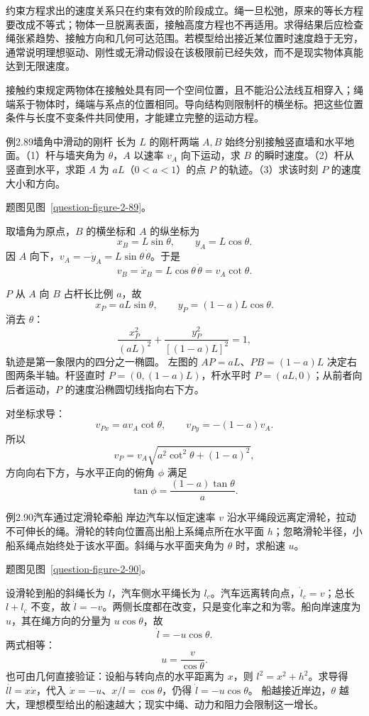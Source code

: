 约束方程求出的速度关系只在约束有效的阶段成立。绳一旦松弛，原来的等长方程要改成不等式；物体一旦脱离表面，接触高度方程也不再适用。求得结果后应检查绳张紧趋势、接触方向和几何可达范围。若模型给出接近某位置时速度趋于无穷，通常说明理想驱动、刚性或无滑动假设在该极限前已经失效，而不是现实物体真能达到无限速度。

接触约束规定两物体在接触处具有同一个空间位置，且不能沿公法线互相穿入；绳端系于物体时，绳端与系点的位置相同。导向结构则限制杆的横坐标。把这些位置条件与长度不变条件共同使用，才能建立完整的运动方程。

\begin{origexamplebox}{例2.89\quad 墙角中滑动的刚杆}
长为 $L$ 的刚杆两端 $A,B$ 始终分别接触竖直墙和水平地面。（1）杆与墙夹角为 $\theta$，$A$ 以速率 $v_A$ 向下运动，求 $B$ 的瞬时速度。（2）杆从竖直到水平，求距 $A$ 为 $aL$（$0<a<1$）的点 $P$ 的轨迹。（3）求该时刻 $P$ 的速度大小和方向。
\par 题图见图~\ref{question-figure-2-89}。
\KQuestionDL
\end{origexamplebox}
\begin{xesolution}
取墙角为原点，$B$ 的横坐标和 $A$ 的纵坐标为
\SlidingRodDiagram
\[
x_B=L\sin\theta,\qquad y_A=L\cos\theta.
\]
因 $A$ 向下，$v_A=-\dot y_A=L\sin\theta\,\dot\theta$。于是
\[
\boxed{v_B=\dot x_B=L\cos\theta\,\dot\theta=v_A\cot\theta}.
\]

$P$ 从 $A$ 向 $B$ 占杆长比例 $a$，故
\[
x_P=aL\sin\theta,\qquad y_P=(1-a)L\cos\theta.
\]
消去 $\theta$：
\[
\boxed{\frac{x_P^2}{(aL)^2}+\frac{y_P^2}{[(1-a)L]^2}=1},
\]
轨迹是第一象限内的四分之一椭圆。
左图的 $AP=aL$、$PB=(1-a)L$ 决定右图两条半轴。杆竖直时 $P=(0,(1-a)L)$，杆水平时 $P=(aL,0)$；从前者向后者运动，$P$ 的速度沿椭圆切线指向右下方。

对坐标求导：
\[
v_{Px}=a v_A\cot\theta,\qquad v_{Py}=-(1-a)v_A.
\]
所以
\[
\boxed{v_P=v_A\sqrt{a^2\cot^2\theta+(1-a)^2}},
\]
方向向右下方，与水平正向的俯角 $\phi$ 满足
\[
\boxed{\tan\phi=\frac{(1-a)\tan\theta}{a}}.
\]
\end{xesolution}

\begin{origexamplebox}{例2.90\quad 汽车通过定滑轮牵船}
岸边汽车以恒定速率 $v$ 沿水平绳段远离定滑轮，拉动不可伸长的绳。滑轮的转向位置高出船上系绳点所在水平面 $h$；忽略滑轮半径，小船系绳点始终处于该水平面。斜绳与水平面夹角为 $\theta$ 时，求船速 $u$。
\par 题图见图~\ref{question-figure-2-90}。
\KQuestionDM
\end{origexamplebox}
\begin{xesolution}
设滑轮到船的斜绳长为 $l$，汽车侧水平绳长为 $l_c$。汽车远离转向点，$\dot l_c=v$；总长 $l+l_c$ 不变，故 $\dot l=-v$。两侧长度都在改变，只是变化率之和为零。船向岸速度为 $u$，其在绳方向的分量为 $u\cos\theta$，故
\BoatTowDiagram
\[
\dot l=-u\cos\theta.
\]
两式相等：
\[
\boxed{u=\frac{v}{\cos\theta}}.
\]
也可由几何直接验证：设船与转向点的水平距离为 $x$，则 $l^2=x^2+h^2$。求导得 $l\dot l=x\dot x$，代入 $\dot x=-u$、$x/l=\cos\theta$，仍得 $\dot l=-u\cos\theta$。
船越接近岸边，$\theta$ 越大，理想模型给出的船速越大；现实中绳、动力和阻力会限制这一增长。
\end{xesolution}

